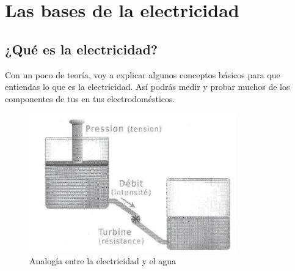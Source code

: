 \documentclass[a5paper,twoside,openany]{book}
\begin{document}
\chapter{Las bases de la electricidad}
\section{¿Qué es la electricidad?}
Con un poco de teoría, voy a explicar algunos conceptos básicos
para que entiendas lo que es la electricidad.
Así podrás medir y probar muchos de los componentes de tus
en tus electrodomésticos.

\begin{figure}[h]
\includegraphics[width=0.8\textwidth]{analogia-agua-elec} 
\caption*{Analogía entre la electricidad y el agua}
\end{figure}
\end{document}
